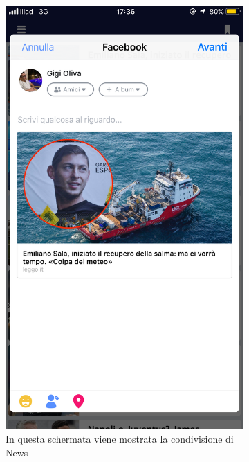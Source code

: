 \documentclass[numbers=noenddot, 12pt, a4paper, oneside]{scrbook}
\begin{document}
\begin{figure}[H]
		\begin{subfigure}{.5\textwidth}
		\centering
		\includegraphics[width=.8\linewidth]{images/Screen/Share}
		\caption{In questa schermata viene mostrata la condivisione di News}
	\end{subfigure}
	\begin{subfigure}{.5\textwidth}
		\centering

\end{subfigure}
\end{figure}
\end{document}
